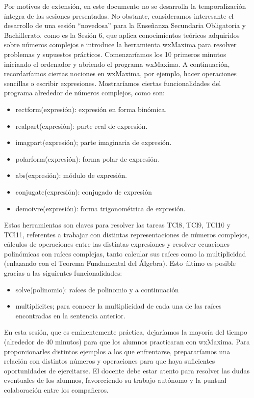\documentclass[../main.tex]{memoir}
\begin{document}
Por motivos de extensión, en este documento no se desarrolla la temporalización íntegra de las sesiones presentadas. No obstante, consideramos interesante el desarrollo de una sesión ``novedosa'' para la Enseñanza Secundaria Obligatoria y Bachillerato, como es la Sesión 6, que aplica conocimientos teóricos adquiridos sobre números complejos e introduce la herramienta wxMaxima para resolver problemas y supuestos prácticos. Comenzaríamos los 10 primeros minutos iniciando el ordenador y abriendo el programa wxMaxima. A continuación, recordaríamos ciertas nociones en wxMaxima, por ejemplo, hacer operaciones sencillas o escribir expresiones. Mostraríamos ciertas funcionalidades del programa alrededor de números complejos, como son:

\begin{itemize}
	\item rectform(expresión): expresión en forma binómica.
	\item realpart(expresión): parte real de expresión.
	\item imagpart(expresión); parte imaginaria de expresión.
	\item polarform(expresión): forma polar de expresión.
	\item abs(expresión): módulo de expresión.
	\item conjugate(expresión): conjugado de expresión
	\item demoivre(expresión): forma trigonométrica de expresión.
\end{itemize}

Estas herramientas son claves para resolver las tareas TCl8, TCl9, TCl10 y TCl11, referentes a trabajar con distintas representaciones de números complejos, cálculos de operaciones entre las distintas expresiones y resolver ecuaciones polinómicas con raíces complejas, tanto calcular sus raíces como la multiplicidad (enlazando con el Teorema Fundamental del Álgebra). Esto último es posible gracias a las siguientes funcionalidades:

\begin{itemize}
	\item solve(polinomio): raíces de polinomio y a continuación
	\item multiplicites; para conocer la multiplicidad de cada una de las raíces encontradas en la sentencia anterior.
\end{itemize}

En esta sesión, que es eminentemente práctica, dejaríamos la mayoría del tiempo (alrededor de 40 minutos) para que los alumnos practicaran con wxMaxima. Para proporcionarles distintos ejemplos a los que enfrentarse, prepararíamos una relación con distintos números y operaciones para que haya suficientes oportunidades de ejercitarse. El docente debe estar atento para resolver las dudas eventuales de los alumnos, favoreciendo su trabajo autónomo y la puntual colaboración entre los compañeros.
\end{document}
